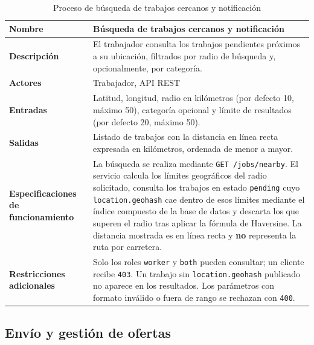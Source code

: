 \documentclass[doc,12pt,a4paper]{apa7}
\begin{document}
\begin{longtable}{|P{3.3cm}|L{11.2cm}|}
\caption{Proceso de búsqueda de trabajos cercanos y notificación}\\
\hline
\textbf{Nombre} & Búsqueda de trabajos cercanos y notificación \\ \hline
\textbf{Descripción} & El trabajador consulta los trabajos pendientes próximos a su ubicación, filtrados por radio de búsqueda y, opcionalmente, por categoría. \\ \hline
\textbf{Actores} & Trabajador, API REST \\ \hline
\textbf{Entradas} & Latitud, longitud, radio en kilómetros (por defecto 10, máximo 50), categoría opcional y límite de resultados (por defecto 20, máximo 50). \\ \hline
\textbf{Salidas} & Listado de trabajos con la distancia en línea recta expresada en kilómetros, ordenada de menor a mayor. \\ \hline
\textbf{Especificaciones de funcionamiento} & La búsqueda se realiza mediante \texttt{GET /jobs/nearby}. El servicio calcula los límites geográficos del radio solicitado, consulta los trabajos en estado \texttt{pending} cuyo \texttt{location.geohash} cae dentro de esos límites mediante el índice compuesto de la base de datos y descarta los que superen el radio tras aplicar la fórmula de Haversine. La distancia mostrada es en línea recta y \textbf{no} representa la ruta por carretera. \\ \hline
\textbf{Restricciones adicionales} & Solo los roles \texttt{worker} y \texttt{both} pueden consultar; un cliente recibe \texttt{403}. Un trabajo sin \texttt{location.geohash} publicado no aparece en los resultados. Los parámetros con formato inválido o fuera de rango se rechazan con \texttt{400}. \\ \hline
\end{longtable}

\subsection{Envío y gestión de ofertas}
\end{document}
